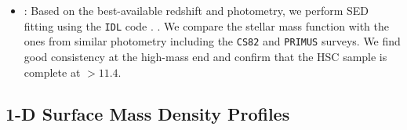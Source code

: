 \documentclass[a4paper,fleqn,usenatbib]{mnras}
\begin{document}
\begin{itemize}
		\item {}: Based on the best-available redshift and \cmodel{} photometry,
			we perform SED fitting using the \texttt{IDL} code \ised{}.
			.
			We compare the \mcmodel{} stellar mass function with the ones from similar
			photometry including the \texttt{CS82} and \texttt{PRIMUS} surveys.
			We find good consistency at the high-mass end and confirm that the HSC
			sample is complete at \mcmodel{}$>11.4$.

	\end{itemize}


\subsection{1-D Surface Mass Density Profiles}
    \label{sec:1d_prof}
\end{document}
